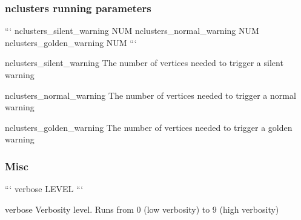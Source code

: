 \subsubsection*{nclusters running parameters}

``` nclusters\-\_\-silent\-\_\-warning N\-U\-M nclusters\-\_\-normal\-\_\-warning N\-U\-M nclusters\-\_\-golden\-\_\-warning N\-U\-M ```


\begin{DoxyItemize}
\item {\ttfamily nclusters\-\_\-silent\-\_\-warning} The number of vertices needed to trigger a silent warning
\item {\ttfamily nclusters\-\_\-normal\-\_\-warning} The number of vertices needed to trigger a normal warning
\item {\ttfamily nclusters\-\_\-golden\-\_\-warning} The number of vertices needed to trigger a golden warning
\end{DoxyItemize}

\subsubsection*{Misc}

``` verbose L\-E\-V\-E\-L ```


\begin{DoxyItemize}
\item {\ttfamily verbose} Verbosity level. Runs from 0 (low verbosity) to 9 (high verbosity) 
\end{DoxyItemize}